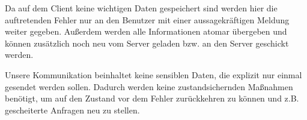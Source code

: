Da auf dem Client keine wichtigen Daten gespeichert sind werden hier die auftretenden Fehler nur an den Benutzer mit einer aussagekräftigen Meldung weiter gegeben. Außerdem werden alle Informationen atomar übergeben und können zusätzlich noch neu vom Server geladen bzw. an den Server geschickt werden. \par

Unsere Kommunikation beinhaltet keine sensiblen Daten, die explizit nur einmal gesendet werden sollen. Dadurch werden keine zustandsichernden Maßnahmen benötigt, um auf den Zustand vor dem Fehler zurückkehren zu können und z.B. gescheiterte Anfragen neu zu stellen.
	



		


	\newpage

